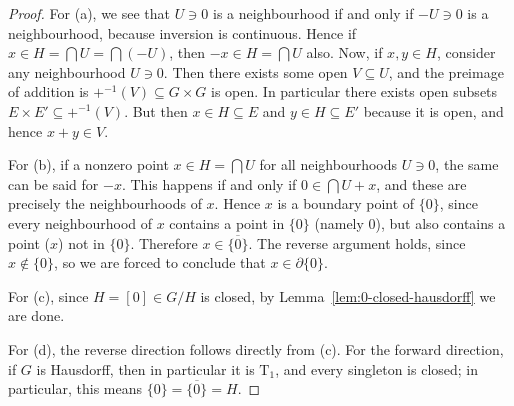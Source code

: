 \begin{proof}
    For (a), we see that \(U \ni 0\) is a neighbourhood if and only if \(-U \ni 0\) is a neighbourhood,
    because inversion is continuous.
    Hence if \(x \in H = \bigcap U = \bigcap (-U)\), then \(-x \in H = \bigcap U\) also.
    Now, if \(x,y \in H\), consider any neighbourhood \(U \ni 0\).
    Then there exists some open \(V \subseteq U\), and the preimage of addition is \(+^{-1}(V) \subseteq G \times G\) is open.
    In particular there exists open subsets \(E \times E' \subseteq +^{-1}(V)\).
    But then \(x \in H \subseteq E\) and \(y \in H \subseteq E'\) because it is open,
    and hence \(x+y \in V\).

    For (b), if a nonzero point \(x \in H = \bigcap U\) for all neighbourhoods \(U \ni 0\),
    the same can be said for \(-x\).
    This happens if and only if \(0 \in \bigcap U+x\),
    and these are precisely the neighbourhoods of \(x\).
    Hence \(x\) is a boundary point of \(\{0\}\),
    since every neighbourhood of \(x\) contains a point in \(\{0\}\) (namely 0),
    but also contains a point (\(x\)) not in \(\{0\}\).
    Therefore \(x \in \overline{\{0\}}\).
    The reverse argument holds, since \(x \notin \{0\}\),
    so we are forced to conclude that \(x \in \partial\{0\}\).

    For (c), since \(H = [0] \in G/H\) is closed, by Lemma~\ref{lem:0-closed-hausdorff} we are done.

    For (d), the reverse direction follows directly from (c).
    For the forward direction, if \(G\) is Hausdorff, then in particular it is \(\text{T}_1\),
    and every singleton is closed;
    in particular, this means \(\{0\} = \overline{\{0\}} = H\).
\end{proof}

